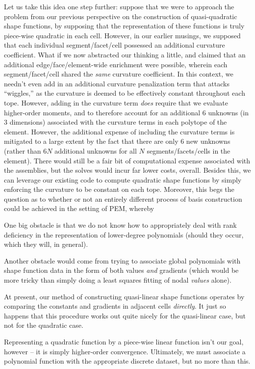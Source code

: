 \documentclass[11pt]{article} %
\begin{document}
Let us take this idea one step further: suppose that we were to approach the problem from our previous perspective on the construction of quasi-quadratic shape functions, by supposing that the representation of these functions is truly piece-wise quadratic in each cell. However, in our earlier musings, we supposed that each individual segment/facet/cell possessed an additional curvature coefficient. What if we now abstracted our thinking a little, and claimed that an additional edge/face/element-wide enrichment were possible, wherein each segment/facet/cell shared the \textit{same} curvature coefficient. In this context, we needn't even add in an additional curvature penalization term that attacks ``wiggles,'' as the curvature is deemed to be effectively constant throughout each tope. However, adding in the curvature term \textit{does} require that we evaluate higher-order moments, and to therefore account for an additional 6 unknowns (in 3 dimensions) associated with the curvature terms in each polytope of the element. However, the additional expense of including the curvature terms is mitigated to a large extent by the fact that there are only 6 new unknowns (rather than 6$N$ additional unknowns for all $N$ segments/facets/cells in the element). There would still be a fair bit of computational expense associated with the assemblies, but the solves would incur far lower costs, overall. Besides this, we can leverage our existing code to compute quadratic shape functions by simply enforcing the curvature to be constant on each tope. Moreover, this begs the question as to whether or not an entirely different process of basis construction could be achieved in the setting of PEM, whereby 

One big obstacle is that we do not know how to appropriately deal with rank deficiency in the representation of lower-degree polynomials (should they occur, which they will, in general).

Another obstacle would come from trying to associate global polynomials with shape function data in the form of both values \textit{and} gradients (which would be more tricky than simply doing a least squares fitting of nodal \textit{values} alone).

At present, our method of constructing quasi-linear shape functions operates by comparing the constants and gradients in adjacent cells \textit{directly}. It just so happens that this procedure works out quite nicely for the quasi-linear case, but not for the quadratic case.

Representing a quadratic function by a piece-wise linear function isn't our goal, however -- it is simply higher-order convergence. Ultimately, we must associate a polynomial function with the appropriate discrete dataset, but no more than this.
\end{document}

